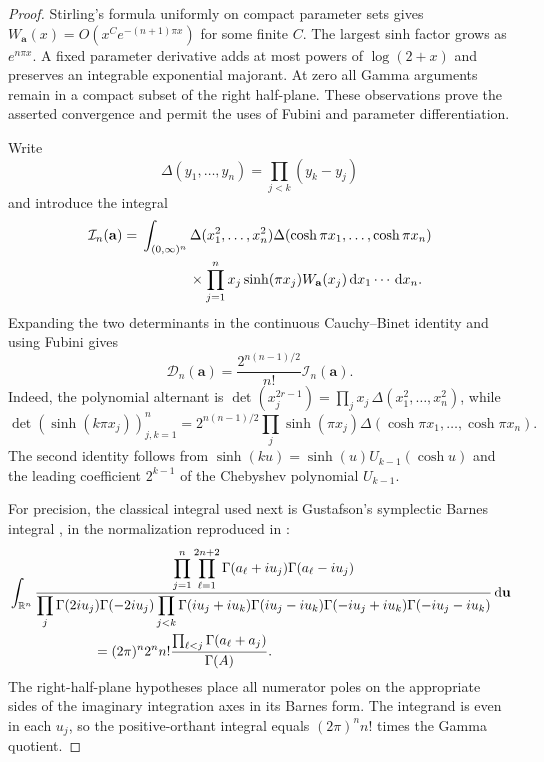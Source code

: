 \begin{proof}
Stirling's formula uniformly on compact parameter sets gives
$W_{\mathbf a}(x)=O(x^C e^{-(n+1)\pi x})$ for some finite $C$.
The largest sinh factor grows as $e^{n\pi x}$.  A fixed parameter
derivative adds at most powers of $\log(2+x)$ and preserves an integrable
exponential majorant.  At zero all Gamma arguments remain in a compact
subset of the right half-plane.  These observations prove the asserted
convergence and permit the uses of Fubini and parameter differentiation.

Write
\[
 \Delta(y_1,\ldots,y_n)=\prod_{j<k}(y_k-y_j)
\]
and introduce the integral
\begin{equation}\label{gn:eq:I}
\begin{split}
 \mathcal I_n(\mathbf a)
 ={}&\int_{(0,\infty)^n}
    \Delta(x_1^2,\ldots,x_n^2)
    \Delta(\cosh\pi x_1,\ldots,\cosh\pi x_n)\\
 &\hspace{12mm}\times
       \prod_{j=1}^n x_j\sinh(\pi x_j)W_{\mathbf a}(x_j)
          \dd x_1\cdots\dd x_n.
\end{split}
\end{equation}
Expanding the two determinants in the continuous Cauchy--Binet identity
and using Fubini gives
\begin{equation}\label{gn:eq:andreief}
 \mathcal D_n(\mathbf a)
      =\frac{2^{n(n-1)/2}}{n!}\mathcal I_n(\mathbf a).
\end{equation}
Indeed, the polynomial alternant is
$\det(x_j^{2r-1})=\prod_jx_j\,\Delta(x_1^2,\ldots,x_n^2)$,
while
\[
 \det(\sinh(k\pi x_j))_{j,k=1}^n
  =2^{n(n-1)/2}\prod_j\sinh(\pi x_j)
                   \Delta(\cosh\pi x_1,\ldots,\cosh\pi x_n).
\]
The second identity follows from
$\sinh(ku)=\sinh(u)U_{k-1}(\cosh u)$ and the leading coefficient
$2^{k-1}$ of the Chebyshev polynomial $U_{k-1}$.

For precision, the classical integral used next is Gustafson's
symplectic Barnes integral \cite{gustafson1994}, in the normalization
reproduced in \cite[equation~(2)]{derkachov2017}:
\begin{equation}\label{gn:eq:gustafson}
\begin{split}
 &\int_{\mathbb R^n}
 \frac{\displaystyle\prod_{j=1}^n\prod_{\ell=1}^{2n+2}
                 \Gamma(a_\ell+iu_j)\Gamma(a_\ell-iu_j)}
 {\displaystyle\prod_j\Gamma(2iu_j)\Gamma(-2iu_j)
       \prod_{j<k}\Gamma(iu_j+iu_k)\Gamma(iu_j-iu_k)
                    \Gamma(-iu_j+iu_k)\Gamma(-iu_j-iu_k)}
                  \dd\mathbf u\\
 &\hspace{22mm}=(2\pi)^n2^nn!
       \frac{\prod_{\ell<j}\Gamma(a_\ell+a_j)}{\Gamma(A)}.
\end{split}
\end{equation}
The right-half-plane hypotheses place all numerator poles on the
appropriate sides of the imaginary integration axes in its Barnes
form.  The integrand is even in each $u_j$, so the positive-orthant
integral equals $(2\pi)^nn!$ times the Gamma quotient.


\end{proof}
